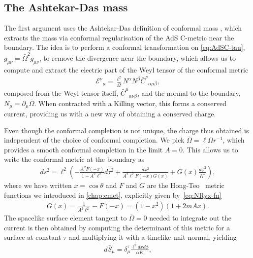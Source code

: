 \documentclass[
twoside,
openright,
frontopenright,
]{dmathesis}
\begin{document}
\subsection{The Ashtekar-Das mass}
\label{sec:ashtekar-das-mass}

The first argument uses the Ashtekar-Das definition of conformal mass
\cite{Ashtekar:1999jx,Das:2000cu}, which extracts the mass via conformal
regularisation of the AdS C-metric near the boundary.  The idea is to perform a
conformal transformation on \eqref{eq:AdSC-tau},
$\bar{g}_{\mu\nu} = {\bar{\Omega}}^{2}g_{\mu\nu}$, to remove the divergence near
the boundary, which allows us to compute and extract the electric part of the
Weyl tensor of the conformal metric
\begin{align}\label{eq:weylelectric}
  \mathcal{E}^\nu{}_\mu=\frac{\ell^{2}}{\bar{\Omega}}N^{\alpha }N^{\beta }
\bar{C}^{\nu}{}_{\alpha \mu \beta },
\end{align}
composed from the Weyl tensor itself, $\bar{C}^{\mu }{}_{\alpha \nu \beta }$, and
the normal to the boundary, $N_{\mu }=\partial _{\mu }{\bar{\Omega}}$. When
contracted with a Killing vector, this forms a conserved current, providing us
with a new way of obtaining a conserved charge.

Even though the conformal completion is not unique, the charge thus obtained is
independent of the choice of conformal completion.  We pick
$\bar{\Omega}=\ell\Omega r^{-1} $, which provides a smooth conformal completion
in the limit $A=0$. This allows us to write the conformal metric at the boundary
as
\begin{align}
  \label{eq:bdymetric}
  ds^2%
  =\ell^2\left( -\frac{A^2 F(-x)}{1-A^2\ell^2}d\tau^2 +
  \frac{dx^2}{A^2\ell^2F(-x)G(x)} + G(x)\frac{d\phi^2}{K^2}\right),
\end{align}
where we have written $x=\cos\theta$ and $F$ and $G$ are the
Hong-Teo~\cite{Hong:2003gx} metric functions we introduced in \cref{chap:cmet},
explicitly given by~\eqref{eq:NRyx-fn}
\begin{align}
  \label{eq:FGhongteore}
  G(x) = \frac{1}{A^2\ell^2} - F(-x) = (1-x^2)(1+2 m A x).
\end{align}
The spacelike surface element tangent to $ \bar{\Omega}=0$ needed to integrate
out the current is then obtained by computing the determinant of this metric for
a surface at constant $\tau$ and multiplying it with a timelike unit normal,
yielding
\begin{align}\label{surfel}
d\bar{S}_{\mu }=\delta^{\tau }_{\mu }\frac{\ell^{2} dx d\phi}{\alpha K},
\end{align}
\end{document}
